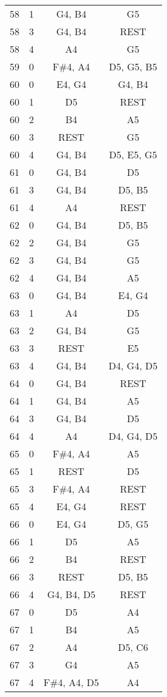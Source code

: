 \documentclass{article}
\begin{document}
\begin{longtable}{|c|c|c|c|}
58 & 1 & G4, B4 & G5 \\ 
58 & 3 & G4, B4 & REST \\ 
58 & 4 & A4 & G5 \\ 
\hline
59 & 0 & F\#4, A4 & D5, G5, B5 \\ 
\hline
60 & 0 & E4, G4 & G4, B4 \\ 
60 & 1 & D5 & REST \\ 
60 & 2 & B4 & A5 \\ 
60 & 3 & REST & G5 \\ 
60 & 4 & G4, B4 & D5, E5, G5 \\ 
\hline
61 & 0 & G4, B4 & D5 \\ 
61 & 3 & G4, B4 & D5, B5 \\ 
61 & 4 & A4 & REST \\ 
\hline
62 & 0 & G4, B4 & D5, B5 \\ 
62 & 2 & G4, B4 & G5 \\ 
62 & 3 & G4, B4 & G5 \\ 
62 & 4 & G4, B4 & A5 \\ 
\hline
63 & 0 & G4, B4 & E4, G4 \\ 
63 & 1 & A4 & D5 \\ 
63 & 2 & G4, B4 & G5 \\ 
63 & 3 & REST & E5 \\ 
63 & 4 & G4, B4 & D4, G4, D5 \\ 
\hline
64 & 0 & G4, B4 & REST \\ 
64 & 1 & G4, B4 & A5 \\ 
64 & 3 & G4, B4 & D5 \\ 
64 & 4 & A4 & D4, G4, D5 \\ 
\hline
65 & 0 & F\#4, A4 & A5 \\ 
65 & 1 & REST & D5 \\ 
65 & 3 & F\#4, A4 & REST \\ 
65 & 4 & E4, G4 & REST \\ 
\hline
66 & 0 & E4, G4 & D5, G5 \\ 
66 & 1 & D5 & A5 \\ 
66 & 2 & B4 & REST \\ 
66 & 3 & REST & D5, B5 \\ 
66 & 4 & G4, B4, D5 & REST \\ 
\hline
67 & 0 & D5 & A4 \\ 
67 & 1 & B4 & A5 \\ 
67 & 2 & A4 & D5, C6 \\ 
67 & 3 & G4 & A5 \\ 
67 & 4 & F\#4, A4, D5 & A4 \\ 

\end{longtable}
\end{document}
